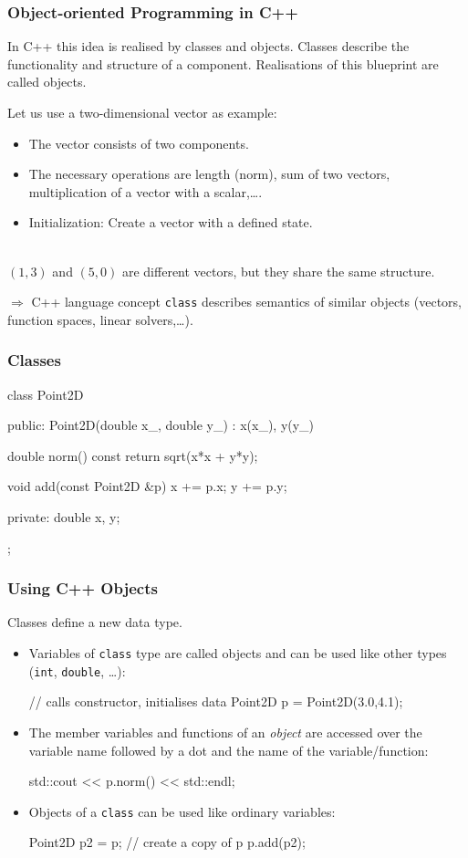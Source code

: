 \documentclass[aspectratio=169,ignorenonframetext,11pt]{beamer}
\def\inline{\lstinline[basicstyle=\small\ttfamily]}
\begin{document}
\begin{frame}
\frametitle{Object-oriented Programming in C++}
In C++ this idea is realised by classes and objects. Classes describe the functionality and structure of a component. Realisations of this blueprint are called objects. 

Let us use a two-dimensional vector as example:
\begin{itemize}
\item The vector consists of two components.
\item The necessary operations are length (norm), sum of two vectors, multiplication of a vector with a scalar,\dots.
\item Initialization: Create a vector with a defined state.
\end{itemize}\ \\
$(1,3)$ and $(5,0)$ are different vectors, but they share the same structure.\\
\pause
\begin{block}{$\Rightarrow$ C++ language concept}
\inline!class! describes semantics of similar objects (vectors, function spaces, linear solvers,\dots).
\end{block}
\end{frame}

\begin{frame}[fragile]
  \frametitle{Classes}
  \begin{cppcode}
class Point2D {
public:
  Point2D(double x_, double y_)
    : x(x_), y(y_)
  {}

  double norm() const {
    return sqrt(x*x + y*y);
  }

  void add(const Point2D &p) {
    x += p.x;
    y += p.y;
  }

private:
  double x, y;
};
  \end{cppcode}
\end{frame}

\begin{frame}[fragile]
  \frametitle{Using C++ Objects}
 Classes define a new data type. 
\begin{itemize}
  \item Variables of \inline!class! type are called objects and can be used like other types (\inline!int!, \inline!double!, \dots):
    \begin{cppcode}
      // calls constructor, initialises data
      Point2D p = Point2D(3.0,4.1); 
    \end{cppcode}
  \item The member variables and functions of an \emph{object} are accessed over the variable name followed by a dot and the name of the variable/function:
    \begin{cppcode}
      std::cout << p.norm() << std::endl;
    \end{cppcode}
  \item Objects of a \inline!class! can be used like ordinary variables:
    \begin{cppcode}
      Point2D p2 = p; // create a copy of p
      p.add(p2);
    \end{cppcode}
  \end{itemize}
\end{frame}
\end{document}
